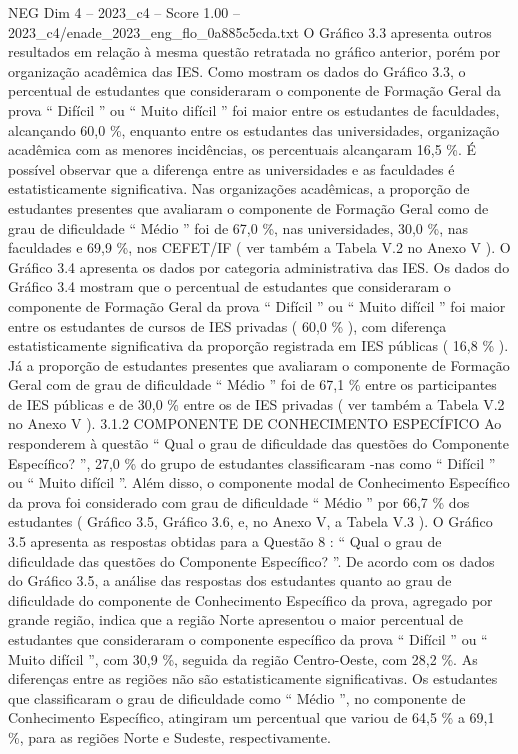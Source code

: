 \begin{textsample}{NEG Dim 4 – 2023\_c4 – Score 1.00 – 2023\_c4/enade\_2023\_eng\_flo\_0a885c5cda.txt}
O Gráfico 3.3 apresenta outros resultados em relação à mesma questão retratada no gráfico anterior, porém por organização acadêmica das IES.
Como mostram os dados do Gráfico 3.3, o percentual de estudantes que consideraram o componente de Formação Geral da prova “ Difícil ” ou “ Muito difícil ” foi maior entre os estudantes de faculdades, alcançando 60,0 \%, enquanto entre os estudantes das universidades, organização acadêmica com as menores incidências, os percentuais alcançaram 16,5 \%.
É possível observar que a diferença entre as universidades e as faculdades é estatisticamente significativa.
Nas organizações acadêmicas, a proporção de estudantes presentes que avaliaram o componente de Formação Geral como de grau de dificuldade “ Médio ” foi de 67,0 \%, nas universidades, 30,0 \%, nas faculdades e 69,9 \%, nos CEFET/IF ( ver também a Tabela V.2 no Anexo V ).
O Gráfico 3.4 apresenta os dados por categoria administrativa das IES.
Os dados do Gráfico 3.4 mostram que o percentual de estudantes que consideraram o componente de Formação Geral da prova “ Difícil ” ou “ Muito difícil ” foi maior entre os estudantes de cursos de IES privadas ( 60,0 \% ), com diferença estatisticamente significativa da proporção registrada em IES públicas ( 16,8 \% ).
Já a proporção de estudantes presentes que avaliaram o componente de Formação Geral com de grau de dificuldade “ Médio ” foi de 67,1 \% entre os participantes de IES públicas e de 30,0 \% entre os de IES privadas ( ver também a Tabela V.2 no Anexo V ). 3.1.2 COMPONENTE DE CONHECIMENTO ESPECÍFICO Ao responderem à questão “ Qual o grau de dificuldade das questões do Componente Específico? ”, 27,0 \% do grupo de estudantes classificaram -nas como “ Difícil ” ou “ Muito difícil ”.
Além disso, o componente modal de Conhecimento Específico da prova foi considerado com grau de dificuldade “ Médio ” por 66,7 \% dos estudantes ( Gráfico 3.5, Gráfico 3.6, e, no Anexo V, a Tabela V.3 ).
O Gráfico 3.5 apresenta as respostas obtidas para a Questão 8 : “ Qual o grau de dificuldade das questões do Componente Específico? ”.
De acordo com os dados do Gráfico 3.5, a análise das respostas dos estudantes quanto ao grau de dificuldade do componente de Conhecimento Específico da prova, agregado por grande região, indica que a região Norte apresentou o maior percentual de estudantes que consideraram o componente específico da prova “ Difícil ” ou “ Muito difícil ”, com 30,9 \%, seguida da região Centro-Oeste, com 28,2 \%.
As diferenças entre as regiões não são estatisticamente significativas.
Os estudantes que classificaram o grau de dificuldade como “ Médio ”, no componente de Conhecimento Específico, atingiram um percentual que variou de 64,5 \% a 69,1 \%, para as regiões Norte e Sudeste, respectivamente.

\end{textsample}
